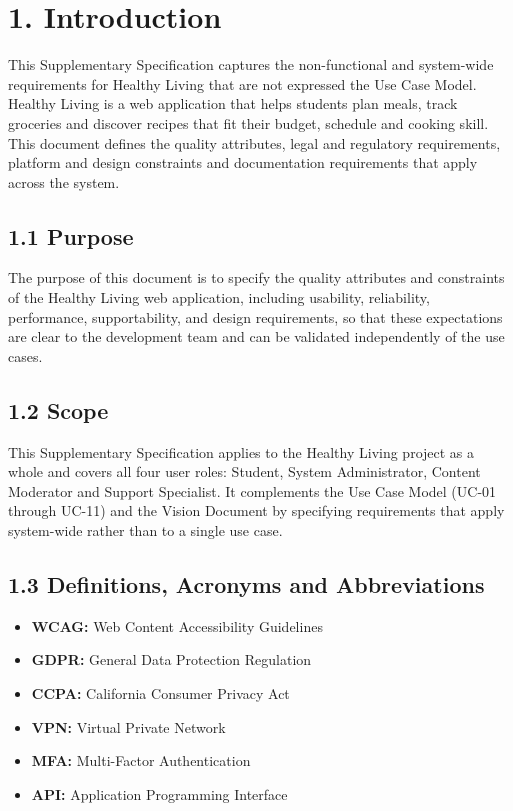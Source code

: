 \documentclass[10pt,letterpaper]{article}
\begin{document}
\section*{1. Introduction}

This Supplementary Specification captures the non-functional and system-wide requirements for Healthy Living that are not expressed the Use Case Model. Healthy Living is a web application that helps students plan meals, track groceries and discover recipes that fit their budget, schedule and cooking skill. This document defines the quality attributes, legal and regulatory requirements, platform and design constraints and documentation requirements that apply across the system.

\subsection*{1.1 Purpose}
The purpose of this document is to specify the quality attributes and constraints of the Healthy Living web application, including usability, reliability, performance, supportability, and design requirements, so that these expectations are clear to the development team and can be validated independently of the use cases.

\subsection*{1.2 Scope}
This Supplementary Specification applies to the Healthy Living project as a whole and covers all four user roles: Student, System Administrator, Content Moderator and Support Specialist. It complements the Use Case Model (UC-01 through UC-11) and the Vision Document by specifying requirements that apply system-wide rather than to a single use case.

\subsection*{1.3 Definitions, Acronyms and Abbreviations}
\begin{itemize}
    \item \textbf{WCAG:} Web Content Accessibility Guidelines
    \item \textbf{GDPR:} General Data Protection Regulation
    \item \textbf{CCPA:} California Consumer Privacy Act
    \item \textbf{VPN:} Virtual Private Network
    \item \textbf{MFA:} Multi-Factor Authentication
    \item \textbf{API:} Application Programming Interface
\end{itemize}
\end{document}

